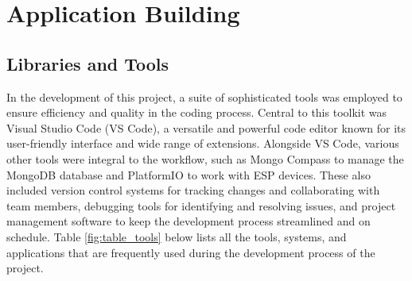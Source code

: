\documentclass[../Main.tex]{subfiles}
\begin{document}
\section{Application Building}
\subsection{Libraries and Tools}
In the development of this project, a suite of sophisticated tools was employed to ensure efficiency and quality in the coding process. Central to this toolkit was Visual Studio Code (VS Code), a versatile and powerful code editor known for its user-friendly interface and wide range of extensions. Alongside VS Code, various other tools were integral to the workflow, such as Mongo Compass to manage the MongoDB database and PlatformIO to work with ESP devices. These also included version control systems for tracking changes and collaborating with team members, debugging tools for identifying and resolving issues, and project management software to keep the development process streamlined and on schedule. Table \ref{fig:table_tools} below lists all the tools, systems, and applications that are frequently used during the development process of the project.
\end{document}
